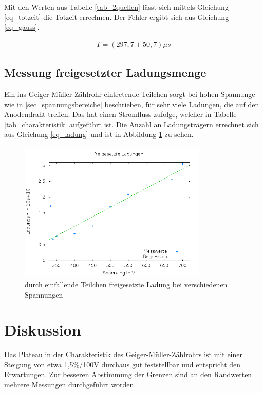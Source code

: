 Mit den Werten aus Tabelle \ref{tab_2quellen} lässt sich mittels Gleichung \eqref{eq_totzeit} die Totzeit errechnen. Der Fehler ergibt
sich aus Gleichung \eqref{eq_gauss}.

\begin{align}
 T = (297,7 \pm 50,7) \mu s
\end{align}

\subsection{Messung freigesetzter Ladungsmenge}
Ein ins Geiger-Müller-Zählrohr eintretende Teilchen sorgt bei hohen Spannunge wie in \ref{sec_spannungsbereiche} beschrieben, für sehr
viele Ladungen, die auf den Anodendraht treffen. Das hat einen Stromfluss zufolge, welcher in Tabelle \ref{tab_charakteristik} 
aufgeführt ist. Die Anzahl an Ladungsträgern errechnet sich aus Gleichung \eqref{eq_ladung} und ist in Abbildung \ref{pic_ladung} zu
sehen.

\begin{figure}[H]
 \includegraphics[width=0.8\textwidth]{pics/ladungen.png}
 \caption{durch einfallende Teilchen freigesetzte Ladung bei verschiedenen Spannungen}
 \label{pic_ladung}
\end{figure}

\section{Diskussion}
Das Plateau in der Charakteristik des Geiger-Müller-Zählrohrs ist mit einer Steigung von etwa 1,5\%/100V durchaus gut feststellbar
und entspricht den Erwartungen. Zur besseren Abstimmung der Grenzen sind an den Randwerten mehrere Messungen durchgeführt worden. 

